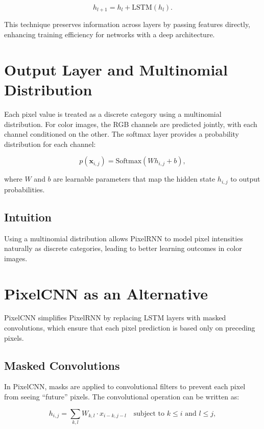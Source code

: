 \documentclass{article}
\begin{document}
\begin{equation}
    h_{l+1} = h_{l} + \text{LSTM}(h_{l}).
\end{equation}

This technique preserves information across layers by passing features directly, enhancing training efficiency for networks with a deep architecture.

\section{Output Layer and Multinomial Distribution}
Each pixel value is treated as a discrete category using a multinomial distribution. For color images, the RGB channels are predicted jointly, with each channel conditioned on the other. The softmax layer provides a probability distribution for each channel:

\begin{equation}
    p(\mathbf{x}_{i,j}) = \text{Softmax}(W h_{i,j} + b),
\end{equation}

where \( W \) and \( b \) are learnable parameters that map the hidden state \( h_{i,j} \) to output probabilities.

\subsection{Intuition}
Using a multinomial distribution allows PixelRNN to model pixel intensities naturally as discrete categories, leading to better learning outcomes in color images.

\section{PixelCNN as an Alternative}
PixelCNN simplifies PixelRNN by replacing LSTM layers with masked convolutions, which ensure that each pixel prediction is based only on preceding pixels.

\subsection{Masked Convolutions}
In PixelCNN, masks are applied to convolutional filters to prevent each pixel from seeing ``future'' pixels. The convolutional operation can be written as:

\begin{equation}
    h_{i,j} = \sum_{k,l} W_{k,l} \cdot x_{i-k, j-l} \quad \text{subject to } k \leq i \text{ and } l \leq j,
\end{equation}
\end{document}
